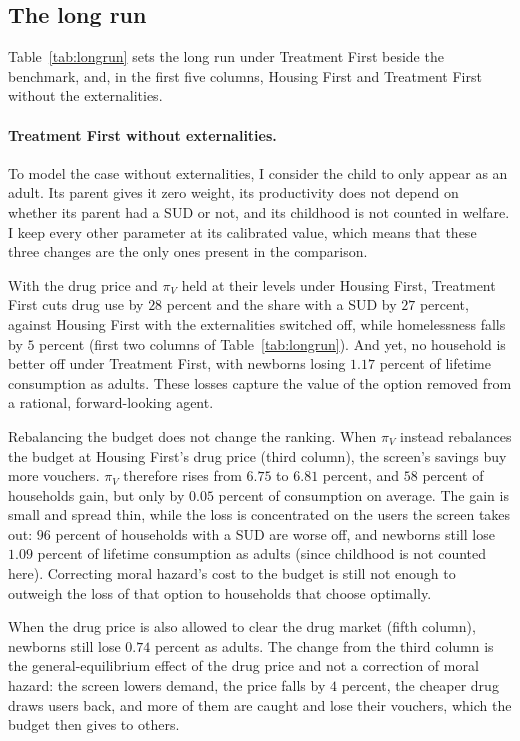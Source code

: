 \documentclass[10pt]{article}
\begin{document}
\subsection{The long run}\label{sec:longrun}

Table~\ref{tab:longrun} sets the long run under Treatment First beside the benchmark, and, in the first five columns, Housing First and Treatment First without the externalities.

\paragraph{Treatment First without externalities.}   To model the case without externalities, I consider the child to only appear as an adult. Its parent gives it zero weight, its productivity does not depend on whether its parent had a SUD or not, and its childhood is not counted in welfare. I keep every other parameter at its calibrated value, which means that these three changes are the only ones present in the comparison.

With the drug price and $\pi_V$ held at their levels under Housing First, Treatment First cuts drug use by $28$ percent and the share with a SUD by $27$ percent, against Housing First with the externalities switched off, while homelessness falls by $5$ percent (first two columns of Table~\ref{tab:longrun}). And yet, no household is better off under Treatment First, with newborns losing $1.17$ percent of lifetime consumption as adults. These losses capture the value of the option removed from a rational, forward-looking agent.

Rebalancing the budget does not change the ranking. When $\pi_V$ instead rebalances the budget at Housing First's drug price (third column), the screen's savings buy more vouchers. $\pi_V$ therefore rises from $6.75$ to $6.81$ percent, and $58$ percent of households gain, but only by $0.05$ percent of consumption on average. The gain is small and spread thin, while the loss is concentrated on the users the screen takes out: $96$ percent of households with a SUD are worse off, and newborns still lose $1.09$ percent of lifetime consumption as adults (since childhood is not counted here). Correcting moral hazard's cost to the budget is still not enough to outweigh the loss of that option to households that choose optimally.

When the drug price is also allowed to clear the drug market (fifth column), newborns still lose $0.74$ percent as adults. The change from the third column is the general-equilibrium effect of the drug price and not a correction of moral hazard: the screen lowers demand, the price falls by $4$ percent, the cheaper drug draws users back, and more of them are caught and lose their vouchers, which the budget then gives to others.
\end{document}
